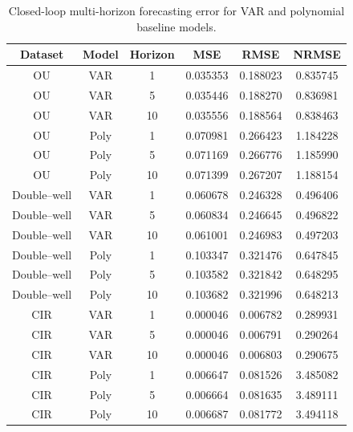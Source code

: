 \documentclass[journal, onecolumn]{IEEEtran}
\begin{document}
\begin{table}[h!]
\centering
\caption{Closed-loop multi-horizon forecasting error for VAR and polynomial baseline models.}
\label{tab:baseline-results-synth}
\begin{tabular}{cccccc}
\toprule
Dataset & Model & Horizon & MSE & RMSE & NRMSE \\
\midrule
OU & VAR & 1  & 0.035353 & 0.188023 & 0.835745 \\
OU & VAR & 5  & 0.035446 & 0.188270 & 0.836981 \\
OU & VAR & 10 & 0.035556 & 0.188564 & 0.838463 \\
OU & Poly & 1  & 0.070981 & 0.266423 & 1.184228 \\
OU & Poly & 5  & 0.071169 & 0.266776 & 1.185990 \\
OU & Poly & 10 & 0.071399 & 0.267207 & 1.188154 \\
\midrule
Double--well & VAR & 1  & 0.060678 & 0.246328 & 0.496406 \\
Double--well & VAR & 5  & 0.060834 & 0.246645 & 0.496822 \\
Double--well & VAR & 10 & 0.061001 & 0.246983 & 0.497203 \\
Double--well & Poly & 1  & 0.103347 & 0.321476 & 0.647845 \\
Double--well & Poly & 5  & 0.103582 & 0.321842 & 0.648295 \\
Double--well & Poly & 10 & 0.103682 & 0.321996 & 0.648213 \\
\midrule
CIR & VAR & 1  & 0.000046 & 0.006782 & 0.289931 \\
CIR & VAR & 5  & 0.000046 & 0.006791 & 0.290264 \\
CIR & VAR & 10 & 0.000046 & 0.006803 & 0.290675 \\
CIR & Poly & 1  & 0.006647 & 0.081526 & 3.485082 \\
CIR & Poly & 5  & 0.006664 & 0.081635 & 3.489111 \\
CIR & Poly & 10 & 0.006687 & 0.081772 & 3.494118 \\
\bottomrule
\end{tabular}
\end{table}
\end{document}
